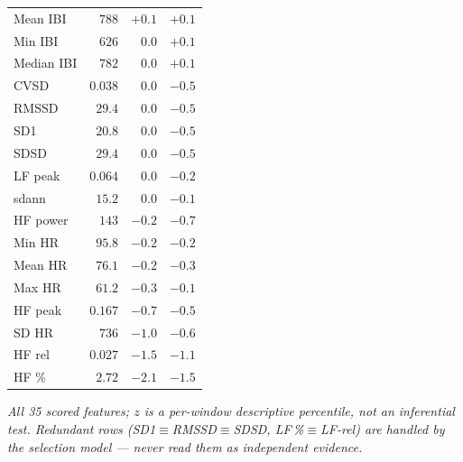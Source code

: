 \documentclass[fontsize=9pt]{scrartcl}
\newlength{\panelB}\setlength{\panelB}{100mm}
\begin{document}
\begin{minipage}[t][210mm][t]{\panelB}
\begin{tcolorbox}[panel,colback=jcindigo,width=\panelB,height=210mm,fontupper=\color{white}]
\begin{tcolorbox}[card, borderline west={2.2mm}{0mm}{jupurple}]
{\begin{tabular}{@{}l r r r@{}}
      Mean IBI & $788$ & $+0.1$ & $+0.1$\\
      Min IBI & $626$ & $0.0$ & $+0.1$\\
      Median IBI & $782$ & $0.0$ & $+0.1$\\
      CVSD & $0.038$ & $0.0$ & $-0.5$\\
      RMSSD & $29.4$ & $0.0$ & $-0.5$\\
      SD1 & $20.8$ & $0.0$ & $-0.5$\\
      SDSD & $29.4$ & $0.0$ & $-0.5$\\
      LF peak & $0.064$ & $0.0$ & $-0.2$\\
      sdann & $15.2$ & $0.0$ & $-0.1$\\
      HF power & $143$ & $-0.2$ & $-0.7$\\
      Min HR & $95.8$ & $-0.2$ & $-0.2$\\
      Mean HR & $76.1$ & $-0.2$ & $-0.3$\\
      Max HR & $61.2$ & $-0.3$ & $-0.1$\\
      HF peak & $0.167$ & $-0.7$ & $-0.5$\\
      SD HR & $736$ & $-1.0$ & $-0.6$\\
      HF rel & $0.027$ & $-1.5$ & $-1.1$\\
      HF \% & $2.72$ & $-2.1$ & $-1.5$\\
    \end{tabular}\par}
    \vspace{1.6mm}
    {\footnotesize\color{jcpurple}\itshape All 35 scored features; $z$ is a
     per-window descriptive percentile, not an inferential test. Redundant rows
     (SD1$\equiv$RMSSD$\equiv$SDSD, LF\,\%$\equiv$LF-rel) are handled by the
     selection model --- never read them as independent evidence.\par}
  \end{tcolorbox}
  \vspace{2.5mm}


\end{tcolorbox}
\end{minipage}
\end{document}
